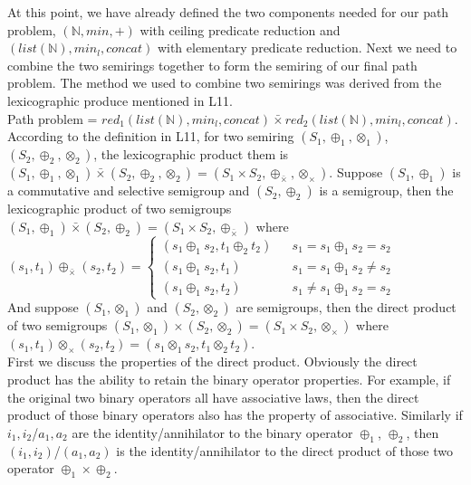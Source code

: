 \documentclass[a4paper,10pt]{article}
\begin{document}
At this point, we have already defined the two components needed for our path problem, $(\mathbb{N},min,+)$ with ceiling predicate reduction and $(list(\mathbb{N}),min_l,concat)$ with elementary predicate reduction. Next we need to combine the two semirings together to form the semiring of our final path problem. The method we used to combine two semirings was derived from the lexicographic produce mentioned in L11.\\ Path problem = $red_1 (list(\mathbb{N}),min_l,concat) \bar{\times} red_2 (list(\mathbb{N}),min_l,concat)$.\\
According to the definition in L11, for two semiring $(S_1,\oplus_1,\otimes_1)$,$(S_2,\oplus_2,\otimes_2)$, the lexicographic product them is $(S_1,\oplus_1,\otimes_1) \bar{\times} (S_2,\oplus_2,\otimes_2) = (S_1\times S_2, \oplus_{\bar{\times}}, \otimes_\times)$.
Suppose $(S_1,\oplus_1)$ is a commutative and selective semigroup and $(S_2,\oplus_2)$ is a semigroup, then the lexicographic product of two semigroups $(S_1,\oplus_1) \bar{\times} (S_2,\oplus_2) = (S_1\times S_2, \oplus_{\bar{\times}})$ where\\
$(s_1,t_1) \oplus_{\bar{\times}} (s_2,t_2)=\left\{
\begin{array}{rcl}
(s_1\oplus_1 s_2,t_1\oplus_2 t_2)      &      & { s_1 = s_1 \oplus_1 s_2 = s_2}\\
(s_1\oplus_1 s_2,t_1)       &      & {s_1 = s_1 \oplus_1 s_2 \neq s_2}\\
(s_1\oplus_1 s_2,t_2)       &      & {s_1 \neq s_1 \oplus_1 s_2 = s_2}
\end{array} \right.$\\
And suppose $(S_1,\otimes_1)$ and $(S_2,\otimes_2)$ are semigroups, then the direct product of two semigroups $(S_1,\otimes_1) \times (S_2,\otimes_2) = (S_1\times S_2, \otimes_\times)$ where\\
$(s_1,t_1) \otimes_\times (s_2,t_2)= (s_1 \otimes_1 s_2, t_1\otimes_2 t_2)$.\\
First we discuss the properties of the direct product. Obviously the direct product has the ability to retain the binary operator properties. For example, if the original two binary operators all have associative laws, then the direct product of those binary operators also has the property of associative. Similarly if $i_1,i_2$/$a_1,a_2$ are the identity/annihilator to the binary operator $\oplus_1$, $\oplus_2$, then $(i_1,i_2)$/$(a_1,a_2)$ is the identity/annihilator to the direct product of those two operator $\oplus_1 \times \oplus_2$.\\
\end{document}
